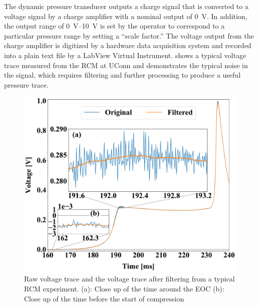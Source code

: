 \documentclass[12pt]{../ussci}
\begin{document}
The dynamic pressure transducer outputs a charge signal that is converted to a
voltage signal by a charge amplifier with a nominal output of \SI{0}{\V}. In
addition, the output range of \SIrange{0}{10}{\V} is set by the operator to
correspond to a particular pressure range by setting a ``scale factor.'' The
voltage output from the charge amplifier is digitized by a hardware data
acquisition system and recorded into a plain text file by a LabView Virtual
Instrument.  shows a typical voltage trace measured from
the RCM at UConn and demonstrates the typical noise in the signal, which
requires filtering and further processing to produce a useful pressure trace.

\begin{figure}[htbp]
    \begin{minipage}[t]{0.48\textwidth}
        \centering
        \includegraphics[width=\linewidth]{figures/raw-voltage.pdf}
        \caption{Raw voltage trace and the voltage trace after filtering from a typical
        RCM experiment. (a): Close up of the
        time around the EOC (b): Close up of the time before the start of
        compression}
        \label{fig:raw-voltage}
    \end{minipage}\hfill%
    \begin{minipage}[t]{0.48\textwidth}
        \centering

\end{minipage}
\end{figure}
\end{document}
